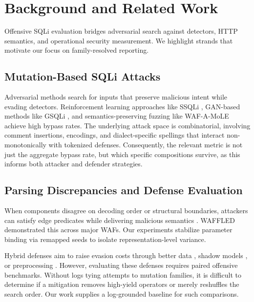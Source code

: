 \section{Background and Related Work}
\label{sec:background}
Offensive SQLi evaluation bridges adversarial search against detectors, HTTP semantics, and operational security measurement. We highlight strands that motivate our focus on family-resolved reporting.


\subsection{Mutation-Based SQLi Attacks}
Adversarial methods search for inputs that preserve malicious intent while evading detectors. Reinforcement learning approaches like SSQLi \cite{guan2023ssqli}, GAN-based methods like GSQLi \cite{khan2024gsqli}, and semantics-preserving fuzzing like WAF-A-MoLE \cite{demetrio2020wafamole} achieve high bypass rates. The underlying attack space is combinatorial, involving comment insertions, encodings, and dialect-specific spellings that interact non-monotonically with tokenized defenses. Consequently, the relevant metric is not just the aggregate bypass rate, but which specific compositions survive, as this informs both attacker and defender strategies.

\subsection{Parsing Discrepancies and Defense Evaluation}
When components disagree on decoding order or structural boundaries, attackers can satisfy edge predicates while delivering malicious semantics \cite{akhavani2025waffled}. WAFFLED demonstrated this across major WAFs. Our experiments stabilize parameter binding via remapped seeds to isolate representation-level variance. 

Hybrid defenses aim to raise evasion costs through better data \cite{elebiary2026wamm}, shadow models \cite{wu2025wafbooster}, or preprocessing \cite{zhang2026bwafsql}. However, evaluating these defenses requires paired offensive benchmarks. Without logs tying attempts to mutation families, it is difficult to determine if a mitigation removes high-yield operators or merely reshuffles the search order. Our work supplies a log-grounded baseline for such comparisons.

